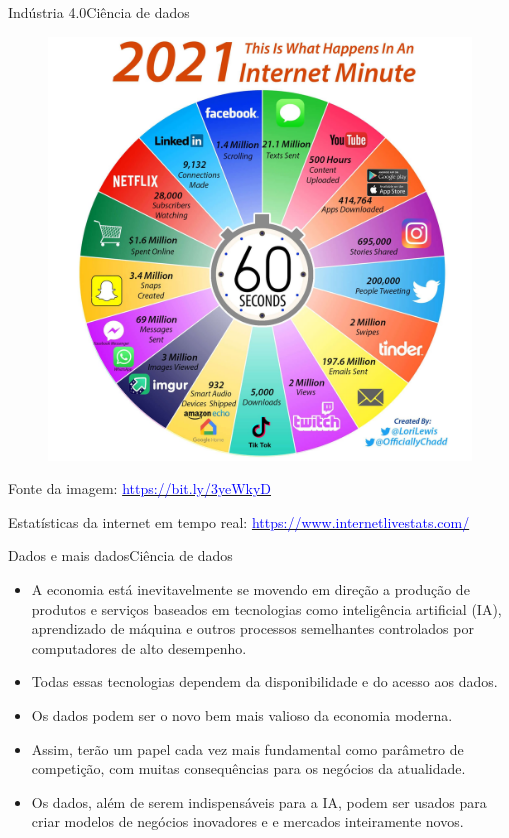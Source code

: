 \documentclass[t]{beamer}
\begin{document}
\begin{ftst}{Indústria 4.0}{Ciência de dados}

\begin{figure}
    \centering
    \includegraphics[scale=0.09]{Figuras/slide00_03.jpg}
\end{figure}

\scriptsize
Fonte da imagem: \href{https://bit.ly/3yeWkyD}{\textcolor{blue}{https://bit.ly/3yeWkyD}} 
 
Estatísticas da internet em tempo real: \href{https://www.internetlivestats.com/}{\textcolor{blue}{https://www.internetlivestats.com/}}

\end{ftst}



\begin{ftst}{Dados e mais dados}{Ciência de dados}
\small
\begin{itemize}
    \item A economia está inevitavelmente se movendo em direção a produção de produtos e serviços baseados em tecnologias como inteligência artificial (IA), aprendizado de máquina e outros processos semelhantes controlados por computadores de alto desempenho.
    \item Todas essas tecnologias dependem da disponibilidade e do acesso aos dados.
    \item Os dados podem ser o novo bem mais valioso da economia moderna.
    \item Assim, terão um papel cada vez mais fundamental como parâmetro de competição, com muitas consequências para os negócios da atualidade.
    \item Os dados, além de serem indispensáveis para a IA, podem ser usados para criar modelos de negócios inovadores e e mercados inteiramente novos.
\end{itemize}

\end{ftst}
\end{document}

